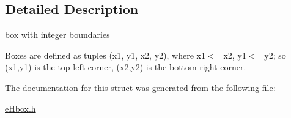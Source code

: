 \subsection{Detailed Description}
box with integer boundaries 

Boxes are defined as tuples (x1, y1, x2, y2), where x1$<$=x2, y1$<$=y2; so (x1,y1) is the top-\/left corner, (x2,y2) is the bottom-\/right corner. 

The documentation for this struct was generated from the following file\-:\begin{DoxyCompactItemize}
\item 
\hyperlink{eHbox_8h}{e\-Hbox.\-h}\end{DoxyCompactItemize}
